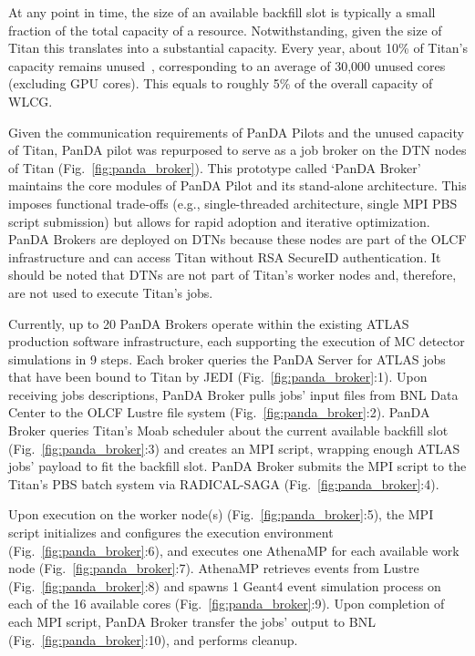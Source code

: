 At any point in time, the size of an available backfill slot is typically a
small fraction of the total capacity of a resource. Notwithstanding, given
the size of Titan this translates into a substantial capacity. Every year,
about 10\% of Titan's capacity remains unused~\cite{barker2016us},
corresponding to an average of 30,000 unused cores (excluding GPU cores).
This equals to roughly 5\% of the overall capacity of WLCG\@.

Given the communication requirements of PanDA Pilots and the unused capacity
of Titan, PanDA pilot was repurposed to serve as a job broker on the DTN
nodes of Titan (Fig.~\ref{fig:panda_broker}). This prototype called `PanDA
Broker' maintains the core modules of PanDA Pilot and its stand-alone
architecture. This imposes functional trade-offs (e.g., single-threaded
architecture, single MPI PBS script submission) but allows for rapid adoption
and iterative optimization. PanDA Brokers are deployed on DTNs because these
nodes are part of the OLCF infrastructure and can access Titan without RSA
SecureID authentication. It should be noted that DTNs are not part of Titan's
worker nodes and, therefore, are not used to execute Titan's jobs.

Currently, up to 20 PanDA Brokers operate within the existing ATLAS
production software infrastructure, each supporting the execution of MC
detector simulations in 9 steps. Each broker queries the PanDA Server for
ATLAS jobs that have been bound to Titan by JEDI
(Fig.~\ref{fig:panda_broker}:1). Upon receiving jobs descriptions, PanDA
Broker pulls jobs' input files from BNL Data Center to the OLCF Lustre file
system (Fig.~\ref{fig:panda_broker}:2). PanDA Broker queries Titan's Moab
scheduler about the current available backfill slot
(Fig.~\ref{fig:panda_broker}:3) and creates an MPI script, wrapping enough
ATLAS jobs' payload to fit the backfill slot. PanDA Broker submits the MPI
script to the Titan's PBS batch system via RADICAL-SAGA
(Fig.~\ref{fig:panda_broker}:4).

Upon execution on the worker node(s) (Fig.~\ref{fig:panda_broker}:5), the MPI
script initializes and configures the execution environment
(Fig.~\ref{fig:panda_broker}:6), and executes one AthenaMP for each available
work node (Fig.~\ref{fig:panda_broker}:7). AthenaMP retrieves events from
Lustre (Fig.~\ref{fig:panda_broker}:8) and spawns 1 Geant4 event simulation
process on each of the 16 available cores (Fig.~\ref{fig:panda_broker}:9).
Upon completion of each MPI script, PanDA Broker transfer the jobs' output to
BNL (Fig.~\ref{fig:panda_broker}:10), and performs cleanup.


